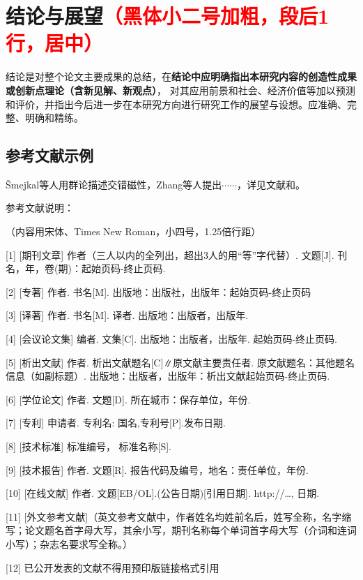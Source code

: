 \chapter[结论与展望]{结论与展望{\song\xiaosi \textcolor{red}{（黑体小二号加粗，段后1行，居中）}}}

结论是对整个论文主要成果的总结，在\textbf{结论中应明确指出本研究内容的创造性成果或创新点理论（含新见解、新观点）}，
对其应用前景和社会、经济价值等加以预测和评价，并指出今后进一步在本研究方向进行研究工作的展望与设想。应准确、完整、明确和精练。

\section{参考文献示例}
\v{S}mejkal等人用群论描述交错磁性\cite{altermagnetic1,altermagnetic2}，Zhang等人提出$\cdots\cdots$，详见文献和。

{\color{red}

    参考文献说明：
    
    （内容用宋体、Times New Roman，小四号，1.25倍行距）

[1]	[期刊文章] 作者（三人以内的全列出，超出3人的用“等”字代替）. 文题[J]. 刊名，年，卷(期)：起始页码-终止页码.

[2]	[专著] 作者. 书名[M]. 出版地：出版社，出版年：起始页码-终止页码

[3]	[译著] 作者. 书名[M]. 译者. 出版地：出版者，出版年.

[4]	[会议论文集] 编者. 文集[C]. 出版地：出版者，出版年. 起始页码-终止页码.

[5]	[析出文献] 作者. 析出文献题名[C]∥原文献主要责任者. 原文献题名：其他题名信息（如副标题）. 出版地：出版者，出版年：析出文献起始页码-终止页码.

[6]	[学位论文] 作者. 文题[D]. 所在城市：保存单位，年份.

[7]	[专利] 申请者. 专利名: 国名,专利号[P].发布日期. 

[8]	[技术标准] 标准编号， 标准名称[S].

[9]	[技术报告] 作者. 文题[R]. 报告代码及编号，地名：责任单位，年份. 

[10]	[在线文献] 作者. 文题[EB/OL].(公告日期)[引用日期]. http://…, 日期.

[11]	[外文参考文献]（英文参考文献中，作者姓名均姓前名后，姓写全称，名字缩写；论文题名首字母大写，其余小写，期刊名称每个单词首字母大写（介词和连词小写）；杂志名要求写全称。）

[12]	已公开发表的文献不得用预印版链接格式引用
}
